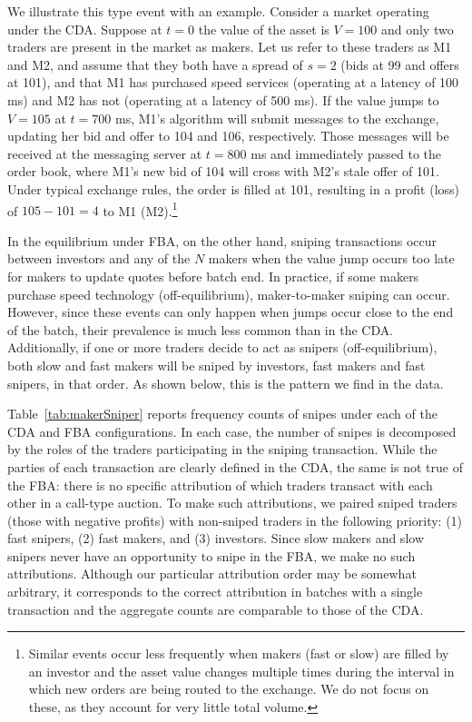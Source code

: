 \documentclass[12pt]{article}
\begin{document}
\begin{appendices}
We illustrate this type event with an example. Consider a market operating under the CDA. Suppose at $t=0$ the value of the asset is $V=100$ and only two traders are present in the market as makers. Let us refer to these traders as M1 and M2, and assume that they both have a spread of $s=2$ (bids at 99 and offers at 101), and that M1 has purchased speed services (operating at a latency of 100 ms) and M2 has not (operating at a latency of 500 ms). If the value jumps to $V=105$ at $t=700$ ms, M1's algorithm will submit messages to the exchange, updating her bid and offer to 104 and 106, respectively. Those messages will be received at the messaging server at $t=800$ ms and immediately passed to the order book, where M1's new bid of 104 will cross with M2's stale offer of 101. Under typical exchange rules, the order is filled at 101, resulting in a profit (loss) of $105-101 = 4$ to M1 (M2).\footnote{Similar events occur less frequently when makers (fast or slow) are filled by an investor and the asset value changes multiple times during the interval in which new orders are being routed to the exchange. We do not focus on these, as they account for very little total volume.} 

In the equilibrium under FBA, on the other hand, sniping transactions occur between investors and any of the $N$ makers when the value jump occurs too late for makers to update quotes before batch end. In practice, if some makers purchase speed technology (off-equilibrium), maker-to-maker sniping can occur. However, since these events can only happen when jumps occur close to the end of the batch, their prevalence is much less common than in the CDA. Additionally, if one or more traders decide to act as snipers (off-equilibrium), both slow and fast makers will be sniped by investors, fast makers and fast snipers, in that order. As shown below, this is the pattern we find in the data. 

Table~\ref{tab:makerSniper} reports frequency counts of snipes under each of the CDA and FBA configurations. In each case, the number of snipes is decomposed by the roles of the traders participating in the sniping transaction. While the parties of each transaction are clearly defined in the CDA, the same is not true of the FBA: there is no specific attribution of which traders transact with each other in a call-type auction. To make such attributions, we paired sniped traders (those with negative profits) with non-sniped traders in the following priority: (1) fast snipers, (2) fast makers, and (3) investors. Since slow makers and slow snipers never have an opportunity to snipe in the FBA, we make no such attributions. Although our particular attribution order may be somewhat arbitrary, it corresponds to the correct attribution in batches with a single transaction and  the aggregate counts are comparable to those of the CDA.


\end{appendices}
\end{document}
